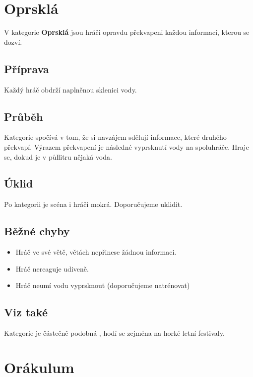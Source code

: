  
 
\needspace{5cm} \section{Oprsklá} \label{oprsklá}  
 
V kategorie \textbf{Oprsklá}{} jsou hráči opravdu překvapeni každou informací, kterou se dozví. 
 
\subsection{Příprava} Každý hráč obdrží naplněnou sklenici vody.  
 
\subsection{Průběh} Kategorie spočívá v tom, že si navzájem sdělují informace, které druhého překvapí. Výrazem překvapení je následné vyprsknutí vody na spoluhráče. Hraje se, dokud je v půllitru nějaká voda.  
 
\subsection{Úklid} Po kategorii je scéna i hráči mokrá. Doporučujeme uklidit. 
 
\subsection{Běžné chyby} \begin{itemize}
\item Hráč ve své větě, větách nepřinese žádnou informaci.
\item Hráč nereaguje udiveně.
\item Hráč neumí vodu vyprsknout (doporučujeme natrénovat)
\end{itemize}
 
\subsection{Viz také} Kategorie je částečně podobná , hodí se zejména na horké letní festivaly. 
 
 
 
\needspace{5cm} \section{Orákulum} \label{orákulum}  
 
